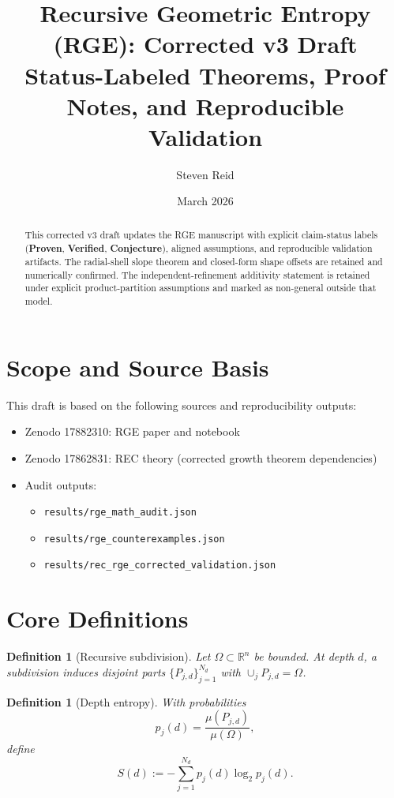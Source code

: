 \documentclass[11pt,a4paper]{article}
\title{Recursive Geometric Entropy (RGE): Corrected v3 Draft\\
\large Status-Labeled Theorems, Proof Notes, and Reproducible Validation}
\author{Steven Reid}
\date{March 2026}
\newtheorem{definition}[theorem]{Definition}
\begin{document}
\maketitle

\begin{abstract}
This corrected v3 draft updates the RGE manuscript with explicit claim-status labels
(\textbf{Proven}, \textbf{Verified}, \textbf{Conjecture}), aligned assumptions, and
reproducible validation artifacts. The radial-shell slope theorem and closed-form
shape offsets are retained and numerically confirmed. The independent-refinement
additivity statement is retained under explicit product-partition assumptions and
marked as non-general outside that model.
\end{abstract}

\section{Scope and Source Basis}
This draft is based on the following sources and reproducibility outputs:
\begin{itemize}
    \item Zenodo 17882310: RGE paper and notebook
    \item Zenodo 17862831: REC theory (corrected growth theorem dependencies)
    \item Audit outputs:
    \begin{itemize}
        \item \texttt{results/rge\_math\_audit.json}
        \item \texttt{results/rge\_counterexamples.json}
        \item \texttt{results/rec\_rge\_corrected\_validation.json}
    \end{itemize}
\end{itemize}

\section{Core Definitions}
\begin{definition}[Recursive subdivision]
Let $\Omega\subset\mathbb{R}^n$ be bounded. At depth $d$, a subdivision induces disjoint parts
$\{P_{j,d}\}_{j=1}^{N_d}$ with $\cup_j P_{j,d}=\Omega$.
\end{definition}

\begin{definition}[Depth entropy]
With probabilities
\[
p_j(d)=\frac{\mu(P_{j,d})}{\mu(\Omega)},
\]
define
\[
S(d):=-\sum_{j=1}^{N_d} p_j(d)\log_2 p_j(d).
\]
\end{definition}
\end{document}
